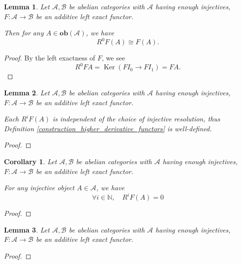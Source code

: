 \documentclass{article}
\newtheorem{lemma}{Lemma}[section]
\newtheorem{corollary}{Corollary}[section]
\numberwithin{equation}{section}
\DeclareMathOperator{\Ker}{Ker}
\begin{document}
\begin{lemma}
Let $\mathscr{A},\mathscr{B}$ be abelian categories with $\mathscr{A}$ having enough injectives, $F:\mathscr{A}\to\mathscr{B}$ be an additive left exact functor. \\
\par Then for any $A\in\mathbf{ob}(\mathscr{A})$, we have
\begin{equation*}
R^0F(A)\cong F(A).
\end{equation*}
\end{lemma}

\begin{proof}
By the left exactness of $F$, we see
\begin{equation*}
R^0FA = \Ker(FI_0\to FI_1) = FA.
\end{equation*}
\end{proof}

\begin{lemma}
Let $\mathscr{A},\mathscr{B}$ be abelian categories with $\mathscr{A}$ having enough injectives, $F:\mathscr{A}\to\mathscr{B}$ be an additive left exact functor. \\
\par Each $R^iF(A)$ is independent of the choice of injective resolution, thus Definition \ref{construction_higher_derivative_functors} is well-defined.
\end{lemma}

\begin{proof}
\end{proof}

\begin{corollary}
Let $\mathscr{A},\mathscr{B}$ be abelian categories with $\mathscr{A}$ having enough injectives, $F:\mathscr{A}\to\mathscr{B}$ be an additive left exact functor. \\
\par For any injective object $A\in\mathscr{A}$, we have
\begin{equation*}
\forall i\in\mathbb{N},\quad R^iF(A) = 0
\end{equation*}
\label{corollary_injective_delta_functor}
\end{corollary}

\begin{proof}
\end{proof}

\begin{lemma}
Let $\mathscr{A},\mathscr{B}$ be abelian categories with $\mathscr{A}$ having enough injectives, $F:\mathscr{A}\to\mathscr{B}$ be an additive left exact functor. \\
\par %
\end{lemma}
\begin{proof}
\end{proof}
\end{document}
